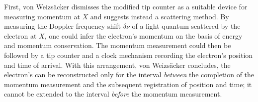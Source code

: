 \documentclass[final,12pt]{article}
\newcommand{\vW}{von Weizsäcker\xspace}
\begin{document}


First, \vW dismisses the modified tip counter as a suitable device for measuring momentum at $X$ and suggests instead a scattering method. By measuring the Doppler frequency shift $\delta\nu$ of a light quantum scattered by the electron at $X$, one could infer the electron's momentum on the basis of energy and momentum conservation. The momentum measurement could then be followed by a tip counter and a clock mechanism recording the electron's position and time of arrival. With this arrangement, \vW concludes, the electron's  can be reconstructed only for the interval \emph{between} the completion of the momentum measurement and the subsequent registration of position and time; it cannot be extended to the interval \emph{before} the momentum measurement.
\end{document}
